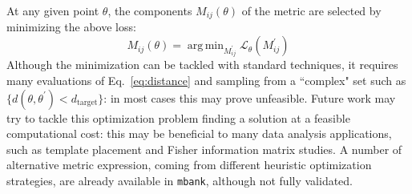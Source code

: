 \documentclass[twocolumn,showpacs,preprintnumbers,nofootinbib,prd,
superscriptaddress,10pt]{revtex4-2}
\DeclareMathOperator*{\argmin}{arg\,min}
\begin{document}
At any given point $\theta$, the components $M_{ij}(\theta)$ of the metric are selected by minimizing the above loss:
\begin{equation} \label{eq:metric_optmization}
	M_{ij}(\theta) = \argmin_{M^\prime_{ij}}  \mathcal{L}_\theta(M^\prime_{ij})
\end{equation}
Although the minimization can be tackled with standard techniques, it requires many evaluations of Eq.~\eqref{eq:distance} and sampling from a ``complex" set such as ${\{d(\theta,\theta^\prime) < d_\mathrm{target}\}}$: in most cases this may prove unfeasible.
Future work may try to tackle this optimization problem finding a solution at a feasible computational cost: this may be beneficial to many data analysis applications, such as template placement and Fisher information matrix studies.
A number of alternative metric expression, coming from different heuristic optimization strategies, are already available in \texttt{mbank}, although not fully validated.

	
	
\end{document}
